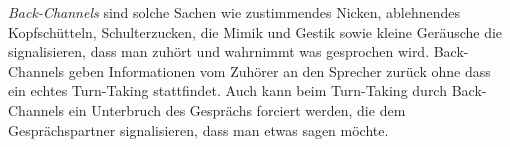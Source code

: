 \textit{Back-Channels} sind solche Sachen wie zustimmendes Nicken, ablehnendes Kopfschütteln,
Schulterzucken, die Mimik und Gestik sowie kleine Geräusche die signalisieren, dass man zuhört und wahrnimmt was gesprochen wird.
Back-Channels geben Informationen vom Zuhörer an den Sprecher zurück ohne dass ein echtes Turn-Taking stattfindet. 
Auch kann beim Turn-Taking durch Back-Channels ein Unterbruch des Gesprächs forciert werden, die dem Gesprächspartner signalisieren,
dass man etwas sagen möchte.  
